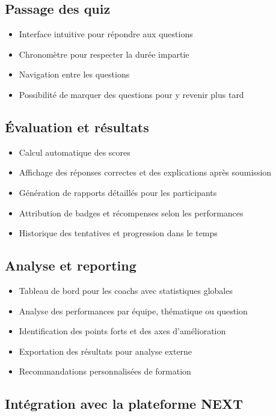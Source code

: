 \documentclass[12pt,a4paper]{report}
\begin{document}
\subsection{Passage des quiz}

\begin{itemize}
\item Interface intuitive pour répondre aux questions
\item Chronomètre pour respecter la durée impartie
\item Navigation entre les questions
\item Possibilité de marquer des questions pour y revenir plus tard
\end{itemize}

\subsection{Évaluation et résultats}

\begin{itemize}
\item Calcul automatique des scores
\item Affichage des réponses correctes et des explications après soumission
\item Génération de rapports détaillés pour les participants
\item Attribution de badges et récompenses selon les performances
\item Historique des tentatives et progression dans le temps
\end{itemize}

\subsection{Analyse et reporting}

\begin{itemize}
\item Tableau de bord pour les coachs avec statistiques globales
\item Analyse des performances par équipe, thématique ou question
\item Identification des points forts et des axes d'amélioration
\item Exportation des résultats pour analyse externe
\item Recommandations personnalisées de formation
\end{itemize}

\subsection{Intégration avec la plateforme NEXT}
\end{document}
